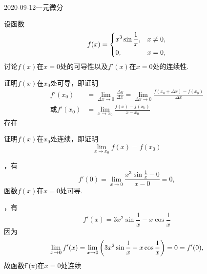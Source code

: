 \documentclass{ctexart}
\begin{document}
\begin{mathques}{2020-09-12}{一元微分}
\begin{ques}
设函数
\[
  f(x) =
  \begin{dcases}
    x^3\sin \frac{1}{x}, & x \neq 0,\\
    0, & x= 0,\\
  \end{dcases}
\]
讨论$f(x)$在$x = 0$处的可导性以及$f'(x)$在$x = 0$处的连续性.
\end{ques}
\begin{solu}
  \begin{mathideabox}
    证明$f(x)$在$x_0$处可导，即证明
    \begin{align*}
      f'(x_0) &= \lim_{\Delta x \to 0} \frac{\Delta y}{\Delta x}
      = \lim_{\Delta x \to 0} \frac{f(x_0 + \Delta x) - f(x_0)}{\Delta x}
      \\
      \text{或}f'(x_0) &= \lim_{x \to x_0} \frac{f(x) - f(x_0)}{x - x_0}
    \end{align*}
    存在
    \par\vspace{1em}
    证明$f(x)$在$x_0$处连续，即证明
    \[
      \lim_{x \to x_0} f(x) = f(x_0)
    \]
  \end{mathideabox}

  ，有
  \[
    f'(0) = \lim_{x \to 0} \frac{x^3 \sin \frac{1}{x} - 0}{x - 0} = 0,
  \]
  函数$f(x)$在$x = 0$处可导.

  ，有
  \[
    f'(x) = 3x^2 \sin \frac{1}{x} - x\cos \frac{1}{x}
  \]
  因为
  \[
    \lim_{x \to 0} f'(x) = \lim_{x \to 0} \qty(3x^2 \sin \frac{1}{x} - x\cos
    \frac{1}{x}) = 0 = f'(0),
  \]
  故函数f'(x)在$x = 0$处连续
\end{solu}
\end{mathques}
\end{document}

